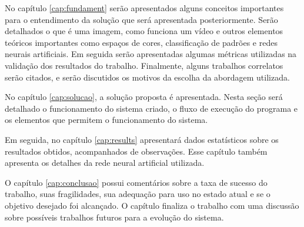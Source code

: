 			No capítulo \ref{cap:fundament} serão apresentados alguns conceitos importantes para o entendimento da solução que será apresentada posteriormente. Serão detalhados o que é uma imagem, como funciona um vídeo e outros elementos teóricos importantes como espaços de cores, classificação de padrões e redes neurais artificiais. Em seguida serão apresentadas algumas métricas utilizadas na validação dos resultados do trabalho. Finalmente, alguns trabalhos correlatos serão citados, e serão discutidos os motivos da escolha da abordagem utilizada.
			
			No capítulo \ref{cap:solucao}, a solução proposta é apresentada. Nesta seção será detalhado o funcionamento do sistema criado, o fluxo de execução do programa e os elementos que permitem o funcionamento do sistema.
			
			Em seguida, no capítulo \ref{cap:results} apresentará dados estatísticos sobre os resultados obtidos, acompanhados de observações. Esse capítulo também apresenta os detalhes da rede neural artificial utilizada.
			
			O capítulo \ref{cap:conclusao} possui comentários sobre a taxa de sucesso do trabalho, suas fragilidades, sua adequação para uso no estado atual e se o objetivo desejado foi alcançado. O capítulo finaliza o trabalho com uma discussão sobre possíveis trabalhos futuros para a evolução do sistema.\cite{de2006introduccao}
			
			








